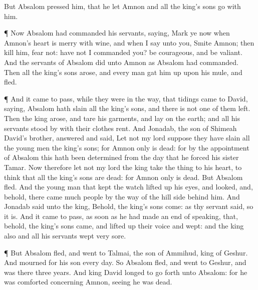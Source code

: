 {But
Absalom
pressed him, that he let
Amnon and all the
king’s
sons
go with him.
\par }{\PP {}¶ Now
Absalom had
commanded his
servants,
saying,
Mark ye now when
Amnon’s
heart is
merry with
wine, and when I
say unto you,
Smite
Amnon; then
kill him,
fear not: have not I
commanded you? be
courageous, and be
valiant.
And the
servants of
Absalom
did unto
Amnon as
Absalom had
commanded. Then all the
king’s
sons
arose, and every
man gat him
up upon his
mule, and
fled.
\par }{\PP {}¶ And it came to pass, while they were in the
way, that
tidings
came to
David,
saying,
Absalom hath
slain all the
king’s
sons, and there is not
one of them
left.
Then the
king
arose, and
tare his
garments, and
lay on the
earth; and all his
servants
stood by with their
clothes
rent.
And
Jonadab, the
son of
Shimeah
David’s
brother,
answered and
said, Let not my
lord
suppose
{} they have
slain all the young
men the
king’s
sons; for
Amnon only is
dead: for by the
appointment of
Absalom this hath been
determined from the
day that he
forced his
sister
Tamar.
Now therefore let not my
lord the
king
take the
thing to his
heart, to
think that all the
king’s
sons are
dead: for
Amnon only is
dead.
But
Absalom
fled. And the young
man that kept the
watch lifted
up his
eyes, and
looked, and, behold, there
came
much
people by the
way of the
hill
side
behind him.
And
Jonadab
said unto the
king, Behold, the
king’s
sons
come: as thy
servant
said, so it is.
And it came to pass, as soon as he had made an
end of
speaking, that, behold, the
king’s
sons
came, and lifted
up their
voice and
wept: and the
king also and all his
servants
wept
very
sore.
\par }{\PP {}¶ But
Absalom
fled, and
went to
Talmai, the
son of
Ammihud,
king of
Geshur. And
{}
mourned for his
son every
day.
So
Absalom
fled, and
went to
Geshur, and was there
three
years.
And
{}
king
David
longed to go
forth unto
Absalom: for he was
comforted concerning
Amnon, seeing he was
dead.

}
